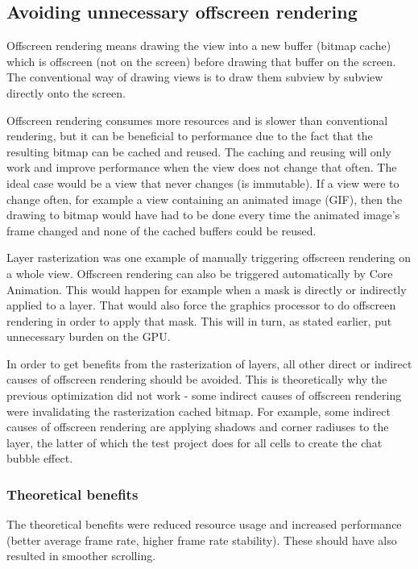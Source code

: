 \documentclass[a4paper,12pt]{article}
\begin{document}
\subsection{Avoiding unnecessary offscreen rendering}
\label{sec:avoiding-unnecessary-offscreen-rendering}
Offscreen rendering means drawing the view into a new buffer (bitmap cache) which is offscreen (not on the screen) before drawing that buffer on the screen. The conventional way of drawing views is to draw them subview by subview directly onto the screen.\cite{MovingPixelsOntoTheScreen}

Offscreen rendering consumes more resources and is slower than conventional rendering, but it can be beneficial to performance due to the fact that the resulting bitmap can be cached and reused. The caching and reusing will only work and improve performance when the view does not change that often. The ideal case would be a view that never changes (is immutable). If a view were to change often, for example a view containing an animated image (GIF), then the drawing to bitmap would have had to be done every time the animated image's frame changed and none of the cached buffers could be reused.

Layer rasterization was one example of manually triggering offscreen rendering on a whole view. Offscreen rendering can also be triggered automatically by Core Animation. This would happen for example when a mask is directly or indirectly applied to a layer. That would also force the graphics processor to do offscreen rendering in order to apply that mask. This will in turn, as stated earlier, put unnecessary burden on the GPU.\cite{MovingPixelsOntoTheScreen}

In order to get benefits from the rasterization of layers, all other direct or indirect causes of offscreen rendering should be avoided. This is theoretically why the previous optimization did not work - some indirect causes of offscreen rendering were invalidating the rasterization cached bitmap. For example, some indirect causes of offscreen rendering are applying shadows and corner radiuses to the layer, the latter of which the test project does for all cells to create the chat bubble effect.\cite{MovingPixelsOntoTheScreen}

\subsubsection{Theoretical benefits}
The theoretical benefits were reduced resource usage and increased performance (better average frame rate, higher frame rate stability). These should have also resulted in smoother scrolling.
\end{document}
